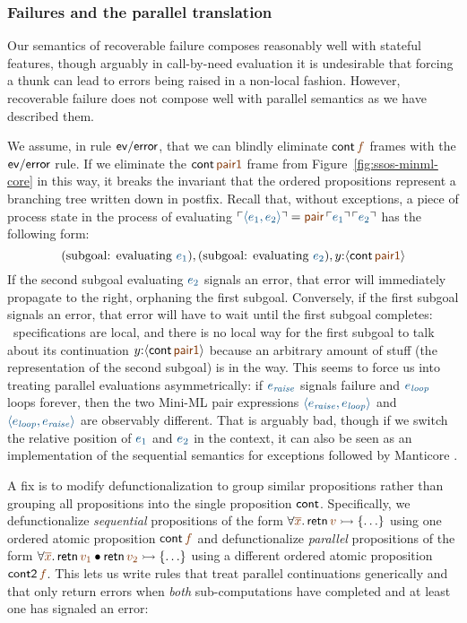 \subsubsection{Failures and the parallel translation}

Our semantics of recoverable failure composes reasonably well with
stateful features, though arguably in call-by-need
evaluation it is undesirable that forcing a thunk can lead to errors
being raised in a non-local fashion. However,
recoverable failure does not compose well with parallel semantics as
we have described them. 

We assume, in rule ${\sf ev/error}$, that we can blindly eliminate
${\sf cont}\,\lf{f}$ frames with the ${\sf ev/error}$ rule.  If we
eliminate the ${\sf cont}\,\lf{\sf pair1}$ frame from
Figure~\ref{fig:ssos-minml-core} in this way, it breaks the invariant
that the ordered propositions represent a branching tree written down
in postfix. Recall that, without exceptions, a piece of process state
in the process of evaluating $\interp{\langle {e_1},{e_2}\rangle}
= \lf{{\sf pair}\,\interp{e_1}\,\interp{e_2}}$ has the
following form:
\[
\mbox{(subgoal: evaluating $\obj{e_1}$)},
\mbox{(subgoal: evaluating $\obj{e_2}$)},
y{:}\susp{{\sf cont}\,\lf{\sf pair1}} 
\]
If the second subgoal evaluating $\obj{e_2}$ signals an error, that error will
immediately propagate to the right, orphaning the first subgoal.
Conversely, if the first subgoal signals an error, that error will
have to wait until the first subgoal completes: \sls~specifications
are local, and there is no local way for the first subgoal to talk
about its continuation $y{:}\susp{{\sf cont}\,\lf{\sf pair1}}$ because an
arbitrary amount of stuff (the representation of the second subgoal)
is in the way. This seems to force us into treating parallel
evaluations asymmetrically: if $\obj{e_{\it raise}}$ signals failure and
$\obj{e_{\it loop}}$ loops forever, then the two Mini-ML pair expressions
$\obj{\langle e_{\it raise}, e_{\it loop} \rangle}$ and 
$\obj{\langle e_{\it
  loop}, e_{\it raise} \rangle}$ are observably different. That is arguably
bad, though if we switch the relative position of $\obj{e_1}$ and 
$\obj{e_2}$
in the context, it can also be seen as an implementation of the
sequential semantics for exceptions followed by Manticore
\cite{fluet08scheduling}.

A fix is to modify defunctionalization to group similar propositions
rather than grouping all propositions into the single
proposition ${\sf cont}$. Specifically, we defunctionalize {\it
  sequential} propositions of the form $\forall
\lf{\overline{x}}.\,{\sf retn}\,\lf{v} \lefti \{\ldots \}$ using one
ordered atomic proposition ${\sf cont}\,\lf{f}$ and defunctionalize
{\it parallel} propositions of the form $\forall
\lf{\overline{x}}.\,{\sf retn}\,\lf{v_1} \fuse {\sf retn}\,\lf{v_2}
\lefti \{\ldots \}$ using a different ordered atomic proposition ${\sf
  cont2}\,\lf{f}$. This lets us write rules that treat parallel
continuations generically and that only return errors when {\it both}
sub-computations have completed and at least one has signaled an
error:

